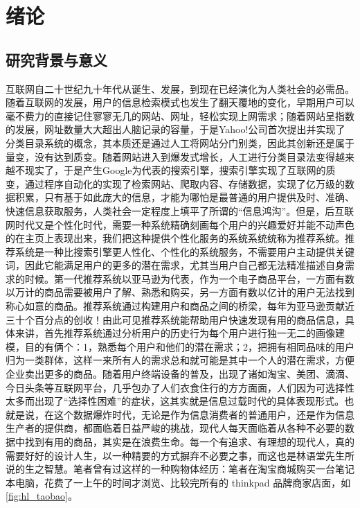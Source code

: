 ﻿
\chapter{绪论}
\label{chap:introduction}
\section{研究背景与意义}
	互联网自二十世纪九十年代从诞生、发展，到现在已经演化为人类社会的必需品。随着互联网的发展，用户的信息检索模式也发生了翻天覆地的变化，早期用户可以毫不费力的直接记住寥寥无几的网站、网址，轻松实现上网需求；随着网站呈指数的发展，网址数量大大超出人脑记录的容量，于是Yahoo!公司首次提出并实现了分类目录系统的概念，其本质还是通过人工将网站分门别类，因此其创新还是属于量变，没有达到质变。随着网站进入到爆发式增长，人工进行分类目录法变得越来越不现实了，于是产生Google为代表的搜索引擎，搜索引擎实现了互联网的质变，通过程序自动化的实现了检索网站、爬取内容、存储数据，实现了亿万级的数据积累，只有基于如此庞大的信息，才能为哪怕是最普通的用户提供及时、准确、快速信息获取服务，人类社会一定程度上填平了所谓的“信息鸿沟”。但是，后互联网时代又是个性化时代\citep{Personalization1}，需要一种系统精确刻画每个用户的兴趣爱好并能不动声色的在主页上表现出来，我们把这种提供个性化服务的系统系统统称为推荐系统。推荐系统是一种比搜索引擎更人性化、个性化的系统服务，不需要用户主动提供关键词，因此它能满足用户的更多的潜在需求，尤其当用户自己都无法精准描述自身需求的时候\citep{recmd-system}。第一代推荐系统以亚马逊为代表，作为一个电子商品平台，一方面有数以万计的商品需要被用户了解、熟悉和购买，另一方面有数以亿计的用户无法找到称心如意的商品。推荐系统通过构建用户和商品之间的桥梁，每年为亚马逊贡献近三十个百分点的创收！由此可见推荐系统能帮助用户快速发现有用的商品信息，具体来讲，首先推荐系统通过分析用户的历史行为每个用户进行独一无二的画像建模\citep{demo-data}，目的有俩个：1，熟悉每个用户和他们的潜在需求；2，把拥有相同品味的用户归为一类群体，这样一来所有人的需求总和就可能是其中一个人的潜在需求，方便企业卖出更多的商品。随着用户终端设备的普及，出现了诸如淘宝、美团、滴滴、今日头条等互联网平台，几乎包办了人们衣食住行的方方面面，人们因为可选择性太多而出现了“选择性困难”的症状，这其实就是信息过载时代的具体表现形式。也就是说，在这个数据爆炸时代，无论是作为信息消费者的普通用户，还是作为信息生产者的提供商，都面临着日益严峻的挑战，现代人每天面临着从各种不必要的数据中找到有用的商品，其实是在浪费生命。每一个有追求、有理想的现代人，真的需要好好的设计人生，以一种精要的方式摒弃不必要之事，而这也是林语堂先生所说的生之智慧。笔者曾有过这样的一种购物体经历：笔者在淘宝商城购买一台笔记本电脑，花费了一上午的时间才浏览、比较完所有的 thinkpad 品牌商家店面，如\autoref{fig:hl_taobao}。
